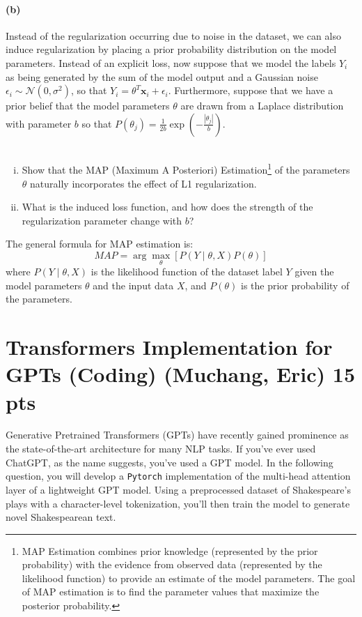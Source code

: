 \documentclass{exam}
\newcommand{\abs}[1]{\left | #1 \right |}
\begin{document}
\paragraph{(b)} Instead of the regularization occurring due to noise in the dataset, we can also induce regularization by placing a prior probability distribution on the model parameters. Instead of an explicit loss, now suppose that we model the labels $Y_i$ as being generated by the sum of the model output and a Gaussian noise $\epsilon_i \sim \mathcal{N}(0, \sigma^2)$, so that $Y_i=\theta^T\mathbf{x}_i+\epsilon_i$. Furthermore, suppose that we have a prior belief that the model parameters $\theta$ are drawn from a Laplace distribution with parameter $b$ so that $P(\theta_j)=\frac{1}{2b}\exp(-\frac{\abs{\theta_j}}{b})$. 
\\\\
\begin{enumerate}[i.]
\item Show that the MAP (Maximum A Posteriori) Estimation\footnote{MAP Estimation combines prior knowledge (represented by the prior probability) with the evidence from observed data (represented by the likelihood function) to provide an estimate of the model parameters. The goal of MAP estimation is to find the parameter values that maximize the posterior probability.} of the parameters $\theta$ naturally incorporates the effect of L1 regularization. 
\item What is the induced loss function, and how does the strength of the regularization parameter change with $b$?
\end{enumerate}

The general formula for MAP estimation is:
$$
    MAP = \arg\max_{\theta} \left[ P(Y \mid \theta, X) P(\theta) \right]
$$
where $P(Y \mid \theta, X)$ is the likelihood function of the dataset label $Y$ given the model parameters $\theta$ and the input data $X$, and $P(\theta)$ is the prior probability of the parameters.


\newpage

\section{Transformers Implementation for GPTs (Coding) (Muchang, Eric) 15 pts}

Generative Pretrained Transformers (GPTs) have recently gained prominence as the state-of-the-art architecture for many NLP tasks. If you've ever used ChatGPT, as the name suggests, you've used a GPT model. In the following question, you will develop a \texttt{Pytorch} implementation of the multi-head attention layer of a lightweight GPT model. Using a preprocessed dataset of Shakespeare's plays with a character-level tokenization, you'll then train the model to generate novel Shakespearean text. 
\end{document}
